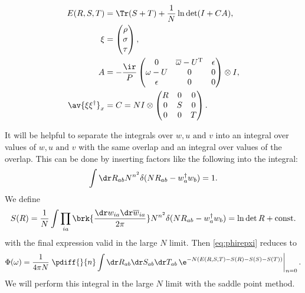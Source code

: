\documentclass[12pt]{article}
\newcommand{\dg}{^\dagger}
\newcommand{\trans}{^\mathrm{T}}
\newcommand{\omb}{\overline{\omega}}
\newcommand{\dw}{\dr w}
\newcommand{\dwb}{\dr\overline{w}}
\begin{document}
\begin{equation}\label{eq:overlapenergy}
\begin{aligned}
  E(R,S,T) &= \Tr(S+T) + \frac{1}{N} \ln \det (I+CA),\\
  \xi &= \begin{pmatrix}
           \rho \\
           \sigma \\
           \tau \\
         \end{pmatrix},
 \\
  A &= -\frac{\ir}{P}
       \begin{pmatrix}
         0        & \omb-U\trans & \epsilon \\
         \omega-U & 0            & 0 \\
         \epsilon & 0            & 0 \\
       \end{pmatrix}\otimes I,\\
  \av{\xi\xi\dg}_x &=  C = N I\otimes
       \begin{pmatrix}
         R & 0 & 0 \\
         0 & S & 0 \\
         0 & 0 & T \\
       \end{pmatrix}.  \end{aligned}
\end{equation}
%

It will be helpful to separate the integrals over $w,u\text{ and }v$ into an integral over values of $w,u\text{ and }v$ with the same overlap and an integral over values of the overlap.
This can be done by inserting factors like the following into the integral:
%
\begin{equation}\label{eq:overlapdelta}
  \int \dr R_{ab} N^{n^2} \delta (N R_{ab} - w_a\dg w_b ) = 1.
\end{equation}
%
We define
%
\begin{equation}\label{eq:overlapentropy}
  S(R) = \frac{1}{N} \int \prod_{ia}\brk{ \frac{\dw_{ia}\dwb_{ia}}{2\pi} } 
  N^{n^2} \delta (N R_{ab} - w_a\dg w_b )
   = \ln\det R + \text{const.}
\end{equation}
%
with the final expression valid in the large $N$ limit.
Then \eqref{eq:phirepxi} reduces to
%
\begin{equation}\label{eq:phioverlap}
  \Phi(\omega) = \frac{1}{4\pi N}  \left.\pdiff{}{n}
       \int \dr R_{ab} \dr S_{ab} \dr T_{ab} 
       \,\e^{-N(E(R,S,T)-S(R)-S(S)-S(T))}
       \right\rvert_{n=0}.
\end{equation}
%
We will perform this integral in the large $N$ limit with the saddle point method.
\end{document}
